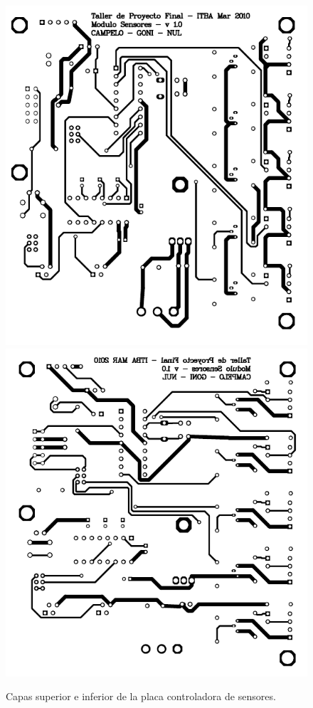 \begin{figure}
\centering
	\includegraphics[scale=.3]{figuras/sense_top.png}
	\includegraphics[scale=.3]{figuras/sense_bottom.png}
	\caption{Capas superior e inferior de la placa controladora de sensores.}
	\label{hF_placa_sense_capas}
\end{figure}

